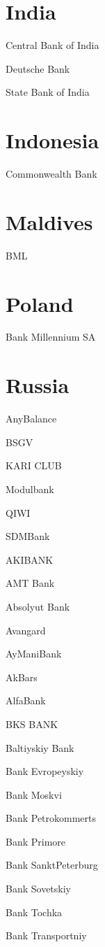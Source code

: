 \documentclass[a4paper,10pt,english]{sphinxmanual}
\begin{document}
\section{India}
\label{\detokenize{banks:india}}
Central Bank of India

Deutsche Bank

State Bank of India


\section{Indonesia}
\label{\detokenize{banks:indonesia}}
Commonwealth Bank


\section{Maldives}
\label{\detokenize{banks:maldives}}
BML


\section{Poland}
\label{\detokenize{banks:poland}}
Bank Millennium SA


\section{Russia}
\label{\detokenize{banks:russia}}
AnyBalance

BSGV

KARI CLUB

Modulbank

QIWI

SDMBank

AKIBANK

AMT Bank

Absolyut Bank

Avangard

AyManiBank

AkBars

AlfaBank

BKS BANK

Baltiyskiy Bank

Bank Evropeyskiy

Bank Moskvi

Bank Petrokommerts

Bank Primore

Bank SanktPeterburg

Bank Sovetskiy

Bank Tochka

Bank Transportniy
\end{document}
